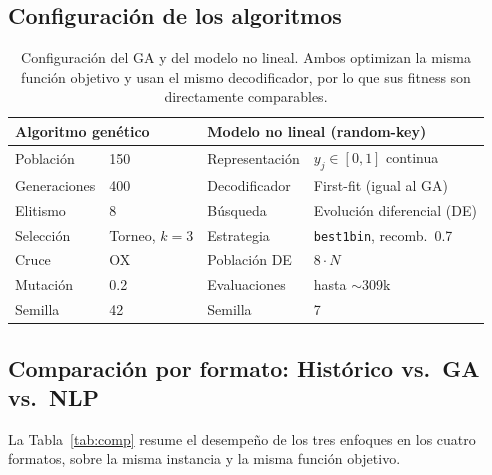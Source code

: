\documentclass[11pt,letterpaper]{article}
\begin{document}
\subsection{Configuraci\'on de los algoritmos}
\begin{table}[H]
\centering\small
\begin{tabular}{ll@{\hskip 2.2em}ll}
\toprule
\multicolumn{2}{l}{\textbf{Algoritmo gen\'etico}} &
\multicolumn{2}{l}{\textbf{Modelo no lineal (random-key)}} \\
\midrule
Poblaci\'on  & 150           & Representaci\'on & $y_j\in[0,1]$ continua \\
Generaciones & 400           & Decodificador    & First-fit (igual al GA) \\
Elitismo     & 8             & B\'usqueda       & Evoluci\'on diferencial (DE) \\
Selecci\'on  & Torneo, $k=3$ & Estrategia       & \texttt{best1bin}, recomb.\ 0.7 \\
Cruce        & OX            & Poblaci\'on DE   & $8\cdot N$ \\
Mutaci\'on   & 0.2           & Evaluaciones     & hasta $\sim$309k \\
Semilla      & 42            & Semilla          & 7 \\
\bottomrule
\end{tabular}
\caption{Configuraci\'on del GA y del modelo no lineal. Ambos optimizan la misma
funci\'on objetivo y usan el mismo decodificador, por lo que sus fitness son
directamente comparables.}
\end{table}

\subsection{Comparaci\'on por formato: Hist\'orico vs.\ GA vs.\ NLP}
La Tabla~\ref{tab:comp} resume el desempe\~no de los tres enfoques en los cuatro
formatos, sobre la misma instancia y la misma funci\'on objetivo.
\end{document}
